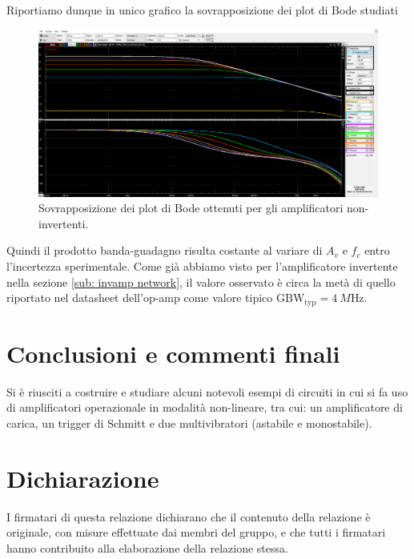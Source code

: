 \documentclass[10pt,a4paper]{article}
\begin{document}
Riportiamo dunque in unico grafico la sovrapposizione dei plot di Bode studiati
\begin{figure}[htbp]
\centering
\includegraphics[scale=0.335]{ampbode}
\caption{Sovrapposizione dei plot di Bode ottenuti per gli amplificatori
non-invertenti. \label{fig: ampbode}}
\end{figure}

Quindi il prodotto banda-guadagno risulta costante al variare di $A_v$ e $f_c$
entro l’incertezza sperimentale. Come già abbiamo visto per l'amplificatore
invertente nella sezione \ref{sub: invamp network}, il valore osservato è
circa la metà di quello riportato nel datasheet dell’op-amp come valore
tipico $\mathrm{GBW_{typ}} = \SI{4}{M\Hz}$.

\section*{Conclusioni e commenti finali}
Si è riusciti a costruire e studiare alcuni notevoli esempi di circuiti in
cui si fa uso di amplificatori operazionale in modalità non-lineare, tra cui:
un amplificatore di carica, un trigger di Schmitt e due multivibratori
(astabile e monostabile).

\section*{Dichiarazione}
I firmatari di questa relazione dichiarano che il contenuto della relazione \`e
originale, con misure effettuate dai membri del gruppo, e che tutti i firmatari
hanno contribuito alla elaborazione della relazione stessa.
\end{document}
